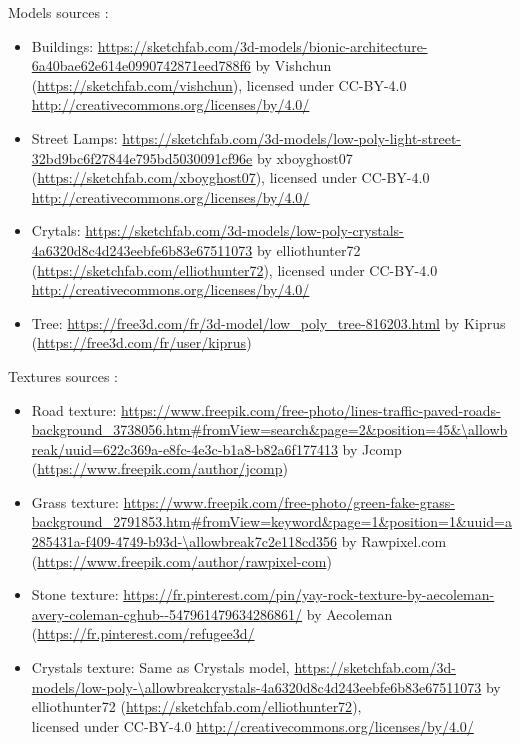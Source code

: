 \documentclass[acmtog,screen,review,nonacm]{acmart}
\begin{document}
Models sources :
\begin{itemize}
    \item Buildings: \url{https://sketchfab.com/3d-models/bionic-architecture-6a40bae62e614e0990742871eed788f6} by Vishchun (\url{https://sketchfab.com/vishchun}), licensed under CC-BY-4.0 \url{http://creativecommons.org/licenses/by/4.0/}
    \item Street Lamps: \url{https://sketchfab.com/3d-models/low-poly-light-street-32bd9bc6f27844e795bd5030091cf96e} by xboyghost07 (\url{https://sketchfab.com/xboyghost07}), licensed under CC-BY-4.0 \url{http://creativecommons.org/licenses/by/4.0/}
    \item Crytals: \url{https://sketchfab.com/3d-models/low-poly-crystals-4a6320d8c4d243eebfe6b83e67511073} by elliothunter72 (\url{https://sketchfab.com/elliothunter72}), licensed under CC-BY-4.0 \url{http://creativecommons.org/licenses/by/4.0/}
    \item Tree: \url{https://free3d.com/fr/3d-model/low_poly_tree-816203.html} by Kiprus (\url{https://free3d.com/fr/user/kiprus})
\end{itemize}

Textures sources :
\begin{itemize}
    \item Road texture: \url{https://www.freepik.com/free-photo/lines-traffic-paved-roads-background_3738056.htm#fromView=search&page=2&position=45&\allowbreak/uuid=622c369a-e8fc-4e3c-b1a8-b82a6f177413} by Jcomp (\url{https://www.freepik.com/author/jcomp})
    \item Grass texture: \url{https://www.freepik.com/free-photo/green-fake-grass-background_2791853.htm#fromView=keyword&page=1&position=1&uuid=a285431a-f409-4749-b93d-\allowbreak7c2e118cd356} by Rawpixel.com (\url{https://www.freepik.com/author/rawpixel-com})
    \item Stone texture: \url{https://fr.pinterest.com/pin/yay-rock-texture-by-aecoleman-avery-coleman-cghub--547961479634286861/} by Aecoleman (\url{https://fr.pinterest.com/refugee3d/}
    \item Crystals texture: Same as Crystals model, \url{https://sketchfab.com/3d-models/low-poly-\allowbreakcrystals-4a6320d8c4d243eebfe6b83e67511073} by elliothunter72 (\url{https://sketchfab.com/elliothunter72}), \\licensed under CC-BY-4.0 \url{http://creativecommons.org/licenses/by/4.0/}
\end{itemize}
\end{document}
